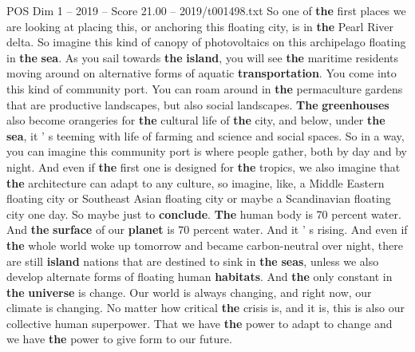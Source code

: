 \begin{textsample}{POS Dim 1 – 2019 – Score 21.00 – 2019/t001498.txt}
So one of \textbf{the} first places we are looking at placing this, or anchoring this floating city, is in \textbf{the} Pearl River delta.
So imagine this kind of canopy of photovoltaics on this archipelago floating in \textbf{the} \textbf{sea}.
As you sail towards \textbf{the} \textbf{island}, you will see \textbf{the} maritime residents moving around on alternative forms of aquatic \textbf{transportation}.
You come into this kind of community port.
You can roam around in \textbf{the} permaculture gardens that are productive landscapes, but also social landscapes. \textbf{The} \textbf{greenhouses} also become orangeries for \textbf{the} cultural life of \textbf{the} city, and below, under \textbf{the} \textbf{sea}, it ' s teeming with life of farming and science and social spaces.
So in a way, you can imagine this community port is where people gather, both by day and by night.
And even if \textbf{the} first one is designed for \textbf{the} tropics, we also imagine that \textbf{the} architecture can adapt to any culture, so imagine, like, a Middle Eastern floating city or Southeast Asian floating city or maybe a Scandinavian floating city one day.
So maybe just to \textbf{conclude}. \textbf{The} human body is 70 percent water.
And \textbf{the} \textbf{surface} of our \textbf{planet} is 70 percent water.
And it ' s rising.
And even if \textbf{the} whole world woke up tomorrow and became carbon-neutral over night, there are still \textbf{island} nations that are destined to sink in \textbf{the} \textbf{seas}, unless we also develop alternate forms of floating human \textbf{habitats}.
And \textbf{the} only constant in \textbf{the} \textbf{universe} is change.
Our world is always changing, and right now, our climate is changing.
No matter how critical \textbf{the} crisis is, and it is, this is also our collective human superpower.
That we have \textbf{the} power to adapt to change and we have \textbf{the} power to give form to our future.

\end{textsample}
